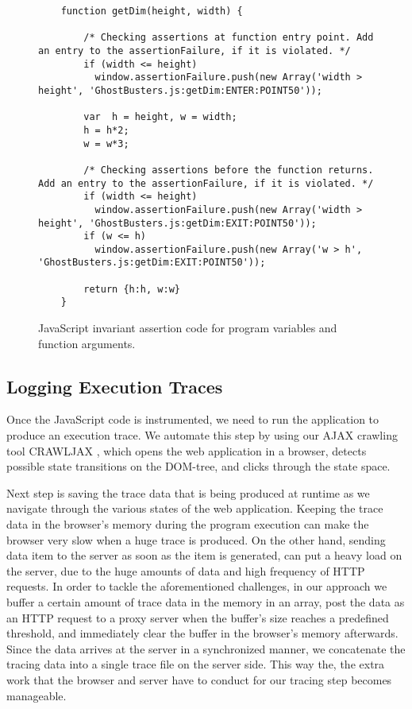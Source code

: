 \begin{figure}
\medskip
\begin{lstlisting}
	function getDim(height, width) {
		
		/* Checking assertions at function entry point. Add an entry to the assertionFailure, if it is violated. */
		if (width <= height) 
  		  window.assertionFailure.push(new Array('width > height', 'GhostBusters.js:getDim:ENTER:POINT50'));		
		
		var  h = height, w = width;					
 		h = h*2;
 		w = w*3;	
		
		/* Checking assertions before the function returns. Add an entry to the assertionFailure, if it is violated. */
		if (width <= height)
  		  window.assertionFailure.push(new Array('width > height', 'GhostBusters.js:getDim:EXIT:POINT50'));   	
		if (w <= h) 
  		  window.assertionFailure.push(new Array('w > h', 'GhostBusters.js:getDim:EXIT:POINT50'));	   	
	
		return {h:h, w:w}
	}	

\end{lstlisting}
\caption{JavaScript invariant assertion code for program variables and function arguments.}
\label{Fig:example_var_assertion}
\end{figure}

\subsection{Logging Execution Traces}
Once the JavaScript code is instrumented, we need to run the application to produce an execution trace. 
We automate this step by using our AJAX crawling tool CRAWLJAX \cite{?}, which opens the web application
in a browser, detects possible state transitions on the DOM-tree, and clicks through the state space.

Next step is saving the trace data that is being produced at runtime as we navigate through the various
states of the web application.
Keeping the trace data in the browser's memory during the program execution can make the browser very slow when a
huge trace is produced. On the other hand, sending data item to the server as soon as the item is generated, can 
put a heavy load on the server, due to the huge amounts of data and high frequency of HTTP requests.
In order to tackle the aforementioned challenges, in our approach we buffer a certain amount of trace data in the 
memory in an array, post the data as an HTTP request to a proxy server when the buffer's size reaches a predefined threshold,
and immediately clear the buffer in the browser's memory afterwards. Since the data arrives at the server in 
a synchronized manner, we concatenate the tracing data into a single trace file on the server side. 
This way the, the extra work that the browser and server have to conduct for our tracing step becomes manageable.

